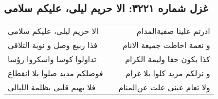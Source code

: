 \begin{center}
\section*{غزل شماره ۳۲۲۱: الا حریم لیلی، علیکم سلامی}
\label{sec:3221}
\begin{longtable}{l p{0.5cm} r}
الا حریم لیلی، علیکم سلامی
&&
ادرتم علینا صفیةالمدام
\\
فذا ربیع وصل و نوبة التلاقی
&&
و نعمة احاطت جمیعة الانام
\\
تداولوا کوسا واسکروا رؤسا
&&
کذا بکون خقا ولیمة الکرام
\\
فوصلکم مدید صلوا بلا انقطاع
&&
و نزلکم مزید کلوا بلا غرام
\\
فلا یهیم قلبی بظلمة اللیالی
&&
ولا تعام عینی علت عن‌المنام
\\
\end{longtable}
\end{center}
